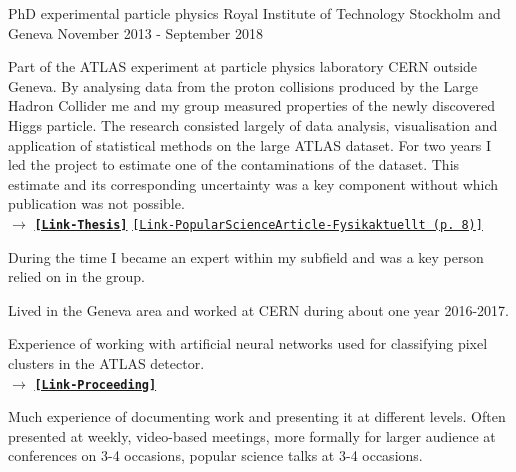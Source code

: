 


\begin{cventries}


\cventry
{PhD experimental particle physics} %
{Royal Institute of Technology} %
{Stockholm and Geneva} %
{November 2013 - September 2018} %
{ %
\begin{cvitems}
\item {Part of the ATLAS experiment at particle physics laboratory CERN outside Geneva.
By analysing data from the proton collisions produced by the Large Hadron Collider me and my group measured properties of the newly discovered Higgs particle. 
The research consisted largely of data analysis, visualisation and application of statistical methods on the large ATLAS dataset. 
For two years I led the project to estimate one of the contaminations of the dataset.
This estimate and its corresponding uncertainty was a key component without which publication was not possible. \\
$\rightarrow$  \href{http://kth.diva-portal.org/smash/record.jsf?pid=diva2\%3A1244395\&dswid=7018}{{\bf \texttt{[Link-Thesis]}}} \href{http://www.fysikersamfundet.se/wp-content/uploads/Fysikaktuellt3-18_Webb.pdf}{\texttt{[Link-PopularScienceArticle-Fysikaktuellt (p. 8)]}}
}
\item {During the time I became an expert within my subfield and was a key person relied on in the group. 
}
\item {Lived in the Geneva area and worked at CERN during about one year 2016-2017.
}
\item {Experience of working with artificial neural networks used for classifying  pixel clusters in the ATLAS detector.
 \\
$\rightarrow$  \href{https://pos.sissa.it/276/213/pdf}{{\bf \texttt{[Link-Proceeding]}}}
}
\item {Much experience of documenting work and presenting it at different levels.
	Often presented at weekly, video-based meetings, more formally for larger audience at conferences on 3-4 occasions, popular science talks at 3-4 occasions.
}
\end{cvitems}}
\end{cventries}
